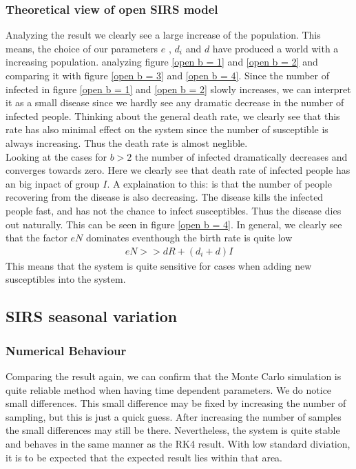 \documentclass[a4paper, 10pt]{article}
\begin{document}
\subsubsection{Theoretical view of open SIRS model} Analyzing the result we clearly see a large increase of the population.
This means, the choice of our parameters $e$ , $d_{i}$ and $d$ have produced a world with a increasing population.
analyzing figure \eqref{open b = 1} and \eqref{open b = 2} and comparing it with figure \eqref{open b = 3} and \eqref{open b = 4}.
Since the number of infected in figure \eqref{open b = 1} and \eqref{open b = 2} slowly increases, we can interpret it as a small disease since we hardly
see any dramatic decrease in the number of infected people. Thinking about the general death rate, we clearly see that this rate has also minimal effect on the system
since the number of susceptible is always increasing. Thus the death rate is almost neglible.
\vspace{3mm}
\\
Looking at the cases for $b > 2$ the number of infected dramatically decreases and converges towards zero.
Here we clearly see that death rate of infected people has an big inpact of group $I$.
A explaination to this: is that the number of people recovering from the disease is also decreasing. The disease
kills the infected people fast, and has not the chance to infect susceptibles. Thus the disease dies out naturally.
This can be seen in figure \eqref{open b = 4}.
In general, we clearly see that the factor $eN$ dominates eventhough the birth rate is quite low
\begin{align}
  eN >> dR + (d_{i} + d)I
\end{align}
This means that the system is quite sensitive for cases when adding new susceptibles into the system.

\subsection{SIRS seasonal variation}
\subsubsection{Numerical Behaviour} Comparing the result again, we can confirm that the Monte Carlo simulation is
quite reliable method when having time dependent parameters. We do notice small differences. This small difference may be fixed by increasing the number of sampling, but this is just a quick guess.
After increasing the number of samples the small differences may still be there. Nevertheless, the system is quite stable and behaves in the same manner as the RK4 result.
With low standard diviation, it is to be expected that the expected result lies within that area.
\end{document}
